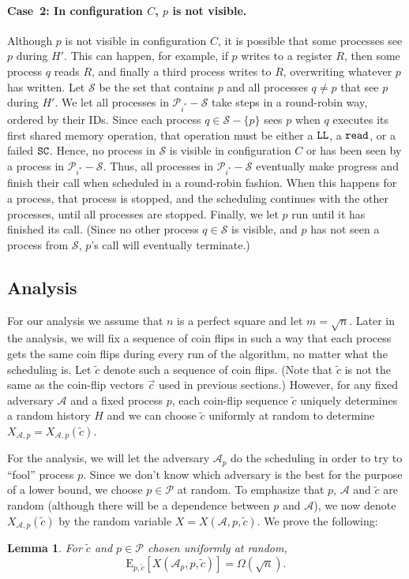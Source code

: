 \documentclass[11pt,letterpaper]{article}
\makeatletter
\providecommand{\@Exp}{{\mathrm{E}}}
\newcommand{\Exp}[2][]{\@Exp_{#1}\left[{#2}\right]}
\def\read{\text{\tt read}\xspace}
\newcommand{\SC}{\text{\tt SC}\xspace}
\newcommand{\LL}{\text{\tt LL}\xspace}
\newtheorem{lemma}[theorem]{Lemma}
\renewcommand{\AA}{\mathcal{A}}
\newcommand{\PP}{\mathcal{P}}
\renewcommand{\SS}{\mathcal{S}}
\newcommand{\vc}{{\vec{c}}}
\newcommand{\tc}{{\tilde{c}}}
\makeatother
\begin{document}
\paragraph{Case~2: In configuration $C$, $p$ is not visible.}
Although $p$ is not visible in configuration $C$, it is possible that some processes see $p$ during $H'$.
This can happen, for example, if $p$ writes to a register $R$, then some process $q$ reads $R$, and finally a third process writes to $R$, overwriting whatever $p$ has written.
Let $\SS$ be the set that contains $p$ and all processes $q\neq p$ that see $p$ during $H'$.
We let all processes in $\PP_{i^\ast}-\SS$ take steps in a round-robin way, ordered by their IDs.
Since each process $q\in\SS-\{p\}$ sees $p$ when $q$ executes its first shared memory operation, that operation must be either a $\LL$, a $\read$, or a failed $\SC$.
Hence, no process in $\SS$ is visible in configuration $C$ or has been seen by a process in $\PP_{i^\ast}-\SS$.
Thus, all processes in $\PP_{i^\ast}-\SS$ eventually make progress and finish their \FAI{} call when scheduled in a round-robin fashion.
When this happens for a process, that process is stopped, and the scheduling continues with the other processes, until all processes are stopped.
Finally, we let $p$ run until it has finished its \FAI{} call.
(Since no other process $q\in\SS$ is visible, and $p$ has not seen a process from $\SS$, $p$'s \FAI{} call will eventually terminate.)


\subsection{Analysis}
\label{analysis.subsec}
For our analysis we assume that $n$ is a perfect square and let $m=\sqrt{n}$.
Later in the analysis, we will fix a sequence of coin flips in such a way that each process gets the same coin flips during every run of the algorithm, no matter what the scheduling is.
Let $\tc$ denote such a sequence of coin flips.
(Note that $\tc$ is not the same as the coin-flip vectors $\vc$ used in previous sections.)
However, for any fixed adversary $\AA$ and a fixed process $p$, each coin-flip sequence $\tc$ uniquely determines a random history $H$ and we can choose $\tc$ uniformly  at random to determine $X_{\AA,p}=X_{\AA,p}(\tc)$.

For the analysis, we will let the adversary $\AA_p$ do the scheduling in order to try to ``fool'' process $p$.
Since we don't know which adversary is the best for the purpose of a lower bound, we choose $p\in\PP$ at random.
To emphasize that $p$, $\AA$ and $\tc$ are random (although there will be a dependence between $p$ and $\AA$), we now denote $X_{\AA,p}(\tc)$ by the random variable $X=X(\AA,p,\tc)$.
We prove the following:
\begin{lemma}\label{lem:weak-adversary-main}
  For $\tc$ and $p\in\PP$ chosen uniformly at random,
  \begin{displaymath}
  \Exp[p,\tc]{X(\AA_p,p,\tc)}=\Omega(\sqrt{n}).
  \end{displaymath}
\end{lemma}
\end{document}

